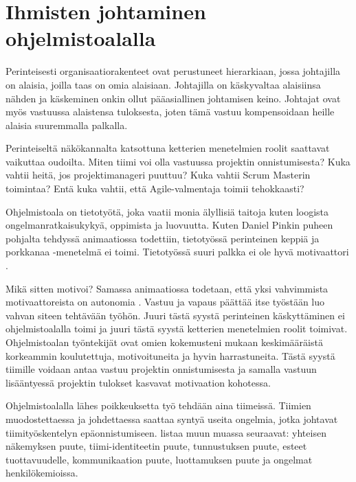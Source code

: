 \documentclass[a4paper]{article}
\begin{document}




\section{Ihmisten johtaminen ohjelmistoalalla}

Perinteisesti organisaatiorakenteet ovat perustuneet hierarkiaan, jossa johtajilla on alaisia, joilla taas on omia alaisiaan. Johtajilla on käskyvaltaa alaisiinsa nähden ja käskeminen onkin ollut pääasiallinen johtamisen keino. Johtajat ovat myös vastuussa alaistensa tuloksesta, joten tämä vastuu kompensoidaan heille alaisia suuremmalla palkalla.

Perinteiseltä näkökannalta katsottuna ketterien menetelmien roolit saattavat vaikuttaa oudoilta. Miten tiimi voi olla vastuussa projektin onnistumisesta? Kuka vahtii heitä, jos projektimanageri puuttuu? Kuka vahtii Scrum Masterin toimintaa? Entä kuka vahtii, että Agile-valmentaja toimii tehokkaasti? 

Ohjelmistoala on tietotyötä, joka vaatii monia älyllisiä taitoja kuten loogista ongelmanratkaisukykyä, oppimista ja luovuutta. Kuten Daniel Pinkin puheen pohjalta tehdyssä animaatiossa todettiin, tietotyössä perinteinen keppiä ja porkkanaa -menetelmä ei toimi. Tietotyössä suuri palkka ei ole hyvä motivaattori \citep{rsaanimate}.

Mikä sitten motivoi? Samassa animaatiossa todetaan, että yksi vahvimmista motivaattoreista on autonomia \citep{rsaanimate}. Vastuu ja vapaus päättää itse työstään luo vahvan siteen tehtävään työhön. Juuri tästä syystä perinteinen käskyttäminen ei ohjelmistoalalla toimi ja juuri tästä syystä ketterien menetelmien roolit toimivat. Ohjelmistoalan työntekijät ovat omien kokemusteni mukaan keskimääräistä korkeammin koulutettuja, motivoituneita ja hyvin harrastuneita. Tästä syystä tiimille voidaan antaa vastuu projektin onnistumisesta ja samalla vastuun lisääntyessä projektin tulokset kasvavat motivaation kohotessa.

Ohjelmistoalalla lähes poikkeuksetta työ tehdään aina tiimeissä. Tiimien muodostettaessa ja johdettaessa saattaa syntyä useita ongelmia, jotka johtavat tiimityöskentelyn epäonnistumiseen. \citet{mcconnell1996} listaa muun muassa seuraavat: yhteisen näkemyksen puute, tiimi-identiteetin puute, tunnustuksen puute, esteet tuottavuudelle, kommunikaation puute, luottamuksen puute ja ongelmat henkilökemioissa. 
\end{document}
